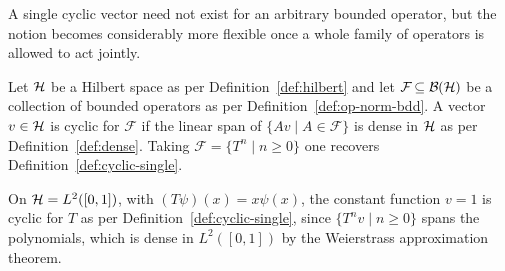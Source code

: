 \noindent A single cyclic vector need not exist for an arbitrary bounded operator, but the notion becomes considerably more flexible once a whole family of operators is allowed to act jointly. 

\begin{definition}\label{def:cyclic-family}
	Let $\H$ be a Hilbert space as per Definition~\ref{def:hilbert} and let $\mathcal{F}\subseteq\mathcal{B}(\H)$ be a collection of bounded operators as per Definition~\ref{def:op-norm-bdd}. A vector $v\in\H$ is cyclic for $\mathcal{F}$ if the linear span of $\{Av\mid A\in\mathcal{F}\}$ is dense in $\H$ as per Definition~\ref{def:dense}. Taking $\mathcal{F}=\{T^n\mid n\geq 0\}$ one recovers Definition~\ref{def:cyclic-single}.
\end{definition}

\begin{example}\label{ex:cyclic-multiplication}
	On $\H=L^2([0,1])$, with $(T\psi)(x)=x\psi(x)$, the constant function $v=1$ is cyclic for $T$ as per Definition~\ref{def:cyclic-single}, since $\{T^nv\mid n\geq0\}$ spans the polynomials, which is dense in $L^2([0,1])$ by the Weierstrass approximation theorem.
\end{example}
